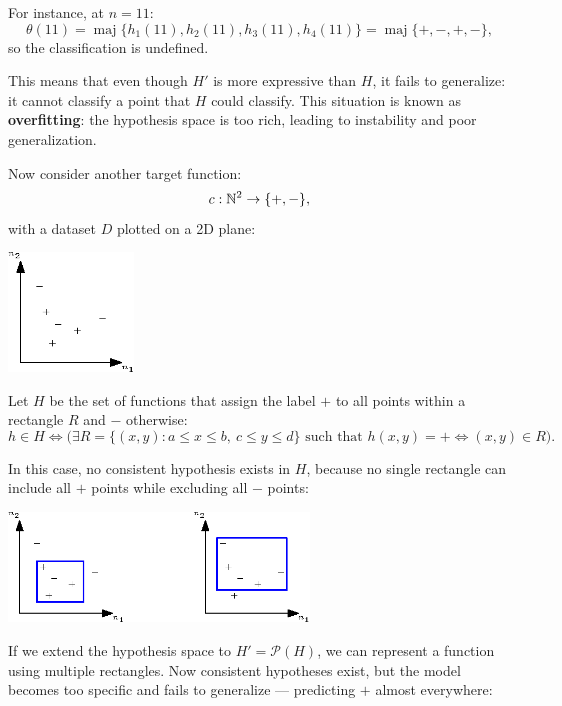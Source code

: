 \documentclass[10pt, letterpaper]{report}
\begin{document}
\bigskip
For instance, at $n=11$:
\begin{equation}
	\theta(11)=\operatorname{maj}\{h_1(11),h_2(11),h_3(11),h_4(11)\}=\operatorname{maj}\{+,-,+,-\},
\end{equation}
so the classification is undefined.

\bigskip
This means that even though $H'$ is more expressive than $H$, it fails to generalize: it cannot classify a point that $H$ could classify.
This situation is known as \textbf{overfitting}: the hypothesis space is too rich, leading to instability and poor generalization.

\bigskip
Now consider another target function:
\begin{equation}
	c:{\mathbb N}^2\rightarrow\{+,-\},
\end{equation}
with a dataset $D$ plotted on a 2D plane:

\begin{center}
	\includegraphics[width=0.25\textwidth]{images/N2_hypothesis_1.eps}
\end{center}

Let $H$ be the set of functions that assign the label $+$ to all points within a rectangle $R$ and $-$ otherwise:
\begin{equation}
	h\in H \iff \Big( \exists R=\{(x,y): a\le x\le b,\ c\le y\le d\} \text{ such that } h(x,y)=+ \iff (x,y)\in R \Big).
\end{equation}

In this case, no consistent hypothesis exists in $H$, because no single rectangle can include all $+$ points while excluding all $-$ points:

\begin{center}
	\includegraphics[width=0.6\textwidth]{images/N2_hypothesis_2.eps}
\end{center}

If we extend the hypothesis space to $H'=\mathcal P(H)$, we can represent a function using multiple rectangles.
Now consistent hypotheses exist, but the model becomes too specific and fails to generalize — predicting $+$ almost everywhere:
\end{document}
